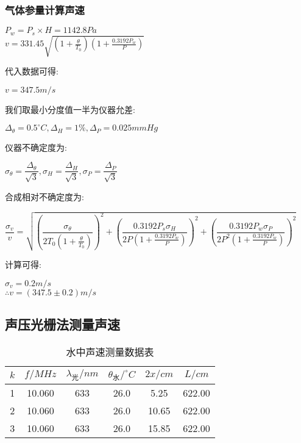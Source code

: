 \documentclass[a4 paper,12pt]{article}
\begin{document}
\subsubsection{气体参量计算声速}
\begin{center}
	$P_{w}=P_{s}\times H=1142.8Pa$\\
	$v=331.45\sqrt{(1+\frac{\theta}{T_{0}})(1+\frac{0.3192P_{w}}{P})}$
\end{center}
代入数据可得:
\begin{center}
	$v=347.5m/s$
\end{center}
我们取最小分度值一半为仪器允差:
\begin{center}
	$\Delta_{\theta}=0.5^{\circ}C,\Delta_{H}=1\%,\Delta_{P}=0.025mmHg$
\end{center}
仪器不确定度为:
\begin{center}
	$\sigma_{\theta}=\dfrac{\Delta_{\theta}}{\sqrt{3}},\sigma_{H}=\dfrac{\Delta_{H}}{\sqrt{3}},\sigma_{P}=\dfrac{\Delta_{P}}{\sqrt{3}}$
\end{center}
合成相对不确定度为:  
\begin{center}
	$\dfrac{\sigma_{v}}{v}=\sqrt{(\dfrac{\sigma_{\theta}}{2T_{0}(1+\frac{\theta}{T_{0}})})^{2}+(\dfrac{0.3192P_{s}\sigma_{H}}{2P(1+\frac{0.3192P_{w}}{P})})^{2}+(\dfrac{0.3192P_{w}\sigma_{P}}{2P^{2}(1+\frac{0.3192P_{w}}{P})})^{2}} $
\end{center}
计算可得:
\begin{center}
	$\sigma_{v}=0.2m/s$\\
	$\therefore v=(347.5\pm 0.2)m/s$ 
\end{center}
\subsection{声压光栅法测量声速}
\begin{table}[H]
	\caption{水中声速测量数据表}
	\label{水中声速测量数据表}
	\centering
	\begin{tabular}{*{6}{c}}
		\toprule[0.5mm]
		$k$&$f/MHz$&$\lambda_{\text{光}}/nm$&$\theta_{\text{水}}/^{\circ}C$&$2x/cm$&$L/cm$\\
		\midrule
		1&10.060&633&26.0&5.25&622.00\\
		2&10.060&633&26.0&10.65&622.00\\
		3&10.060&633&26.0&15.85&622.00\\
		\bottomrule[0.5mm]
	\end{tabular}
\end{table}
\end{document}
